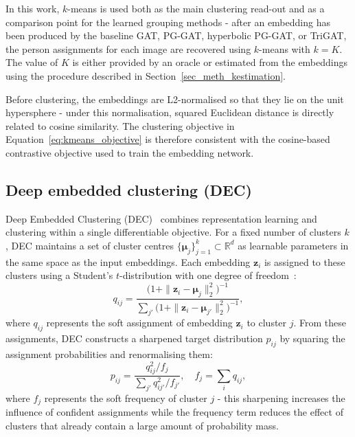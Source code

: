 In this work,
$k$-means is used both as the main clustering read-out and as a comparison point for the learned grouping methods -
after an embedding has been produced by the baseline GAT, PG-GAT, hyperbolic PG-GAT, or TriGAT,
the person assignments for each image are recovered using $k$-means with $k = K$.
The value of $K$ is either provided by an oracle
or estimated from the embeddings using the procedure described in Section~\ref{sec_meth_kestimation}.

Before clustering, the embeddings are L2-normalised so that they lie on the unit hypersphere -
under this normalisation, squared Euclidean distance is directly related to cosine similarity.
The clustering objective in Equation~\eqref{eq:kmeans_objective} is therefore consistent
with the cosine-based contrastive objective used to train the embedding network.

\subsection{Deep embedded clustering (DEC)}
\label{sec_meth_dec_prelim}

Deep Embedded Clustering (DEC)~\cite{xie2016dec} combines representation learning and clustering
within a single differentiable objective.
For a fixed number of clusters $k$,
DEC maintains a set of cluster centres $\{\boldsymbol{\mu}_j\}_{j=1}^{k} \subset \mathbb{R}^{d}$
as learnable parameters in the same space as the input embeddings.
Each embedding $\mathbf{z}_i$ is assigned to these clusters
using a Student's $t$-distribution with one degree of freedom~\cite{vandermaaten2008tsne}:
\begin{equation}
    q_{ij}
    = \frac{\bigl(1 + \|\mathbf{z}_i - \boldsymbol{\mu}_j\|_2^{2}\bigr)^{-1}}
           {\sum_{j'} \bigl(1 + \|\mathbf{z}_i - \boldsymbol{\mu}_{j'}\|_2^{2}\bigr)^{-1}},
    \label{eq:dec_q_prelim}
\end{equation}
where $q_{ij}$ represents the soft assignment of embedding $\mathbf{z}_i$ to cluster $j$.
From these assignments,
DEC constructs a sharpened target distribution $p_{ij}$
by squaring the assignment probabilities and renormalising them:
\begin{equation}
    p_{ij}
    = \frac{q_{ij}^{2} / f_j}
           {\sum_{j'} q_{ij'}^{2} / f_{j'}},
    \quad
    f_j = \sum_{i} q_{ij},
    \label{eq:dec_p_prelim}
\end{equation}
where $f_j$ represents the soft frequency of cluster $j$ -
this sharpening increases the influence of confident assignments
while the frequency term reduces the effect of clusters that already contain a large amount of probability mass.

